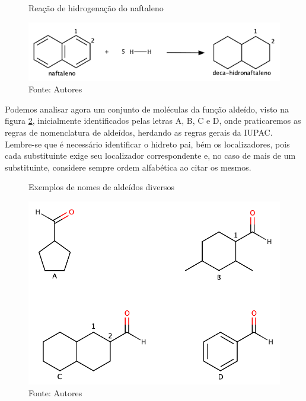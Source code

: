 \begin{figure}[h]
	\centering
	\vspace{0.5cm}
	\caption{Reação de hidrogenação do naftaleno}
	\includegraphics[width=1\linewidth]{imagens/hidrogenacao.png}
	\caption*{Fonte: Autores}
	\label{fig:hidrogenacao}
\end{figure}

Podemos analisar agora um conjunto de moléculas da função aldeído, visto na figura \ref{fig:conjunto}, inicialmente identificados pelas letras A, B, C e D, onde praticaremos as regras de nomenclatura de aldeídos, herdando as regras gerais da IUPAC. Lembre-se que é necessário identificar o hidreto pai, bém os localizadores, pois cada substituinte exige seu localizador correspondente e, no caso de mais de um substituinte, considere sempre ordem alfabética ao citar os mesmos.

\begin{figure}[H]
	\centering
	\vspace{0.5cm}
	\caption{Exemplos de nomes de aldeídos diversos}
	\includegraphics[width=0.65\linewidth]{imagens/exemplosaldeidos.png}
	\caption*{Fonte: Autores}
	\label{fig:conjunto}
\end{figure}

